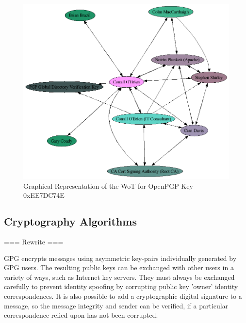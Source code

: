 \begin{figure}[p]

\label{fig:wot}

\begin{center}

\includegraphics[bb= 0 0 868 739,scale=0.5]{include/EE7DC74E.png}

\end{center}

\caption{Graphical Representation of the WoT for OpenPGP Key 0xEE7DC74E}

\end{figure}

\clearpage

\subsection{Cryptography Algorithms}

=== Rewrite ===


GPG encrypts messages using asymmetric key-pairs individually generated
by GPG users. The resulting public keys can be exchanged with other
users in a variety of ways, such as Internet key servers. They must
always be exchanged carefully to prevent identity spoofing by
corrupting public key 'owner' identity correspondences. It is
also possible to add a cryptographic digital signature to a message, so
the message integrity and sender can be verified, if a particular
correspondence relied upon has not been corrupted.


